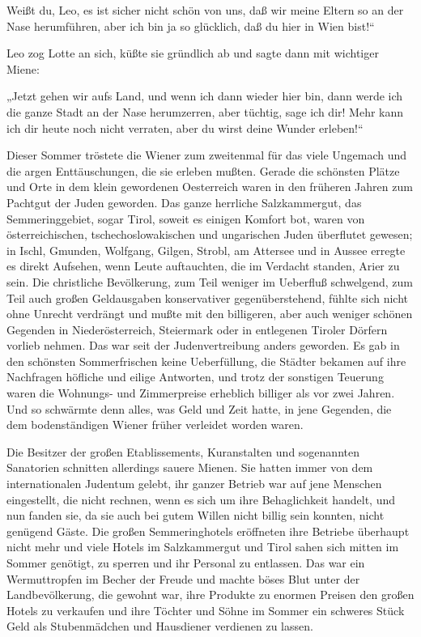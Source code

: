 Weißt du, Leo, es ist sicher nicht schön von uns, daß wir meine
Eltern so an der Nase herumführen, aber ich bin ja so glücklich,
daß du hier in Wien bist!“

Leo zog Lotte an sich, küßte sie gründlich ab und sagte dann mit
wichtiger Miene:

„Jetzt gehen wir aufs Land, und wenn ich dann wieder hier bin, dann
werde ich die ganze Stadt an der Nase herumzerren, aber tüchtig,
sage ich dir! Mehr kann  ich dir heute noch nicht
verraten, aber du wirst deine Wunder erleben!“

Dieser Sommer tröstete die Wiener zum zweitenmal für das viele
Ungemach und die argen Enttäuschungen, die sie erleben mußten.
Gerade die schönsten Plätze und Orte in dem klein gewordenen
Oesterreich waren in den früheren Jahren zum Pachtgut der Juden
geworden. Das ganze herrliche Salzkammergut, das Semmeringgebiet,
sogar Tirol, soweit es einigen Komfort bot, waren von
österreichischen, tschechoslowakischen und ungarischen Juden
überflutet gewesen; in Ischl, Gmunden, Wolfgang, Gilgen, Strobl, am
Attersee und in Aussee erregte es direkt Aufsehen, wenn Leute
auftauchten, die im Verdacht standen, Arier zu sein. Die
christliche Bevölkerung, zum Teil weniger im Ueberfluß schwelgend,
zum Teil auch großen Geldausgaben konservativer gegenüberstehend,
fühlte sich nicht ohne Unrecht verdrängt und mußte mit den
billigeren, aber auch weniger schönen Gegenden in Niederösterreich,
Steiermark oder in entlegenen Tiroler Dörfern vorlieb nehmen. Das
war seit der Judenvertreibung anders geworden. Es gab in den
schönsten Sommerfrischen keine Ueberfüllung, die Städter bekamen
auf ihre Nachfragen höfliche und eilige Antworten, und trotz der
sonstigen Teuerung waren die Wohnungs- und Zimmerpreise erheblich
billiger als vor zwei Jahren. Und so schwärmte denn alles, was Geld
und Zeit hatte, in jene Gegenden, die dem bodenständigen Wiener
früher verleidet worden waren.

Die Besitzer der großen Etablissements, Kuranstalten und
sogenannten Sanatorien schnitten allerdings sauere 
Mienen. Sie hatten immer von dem internationalen Judentum gelebt,
ihr ganzer Betrieb war auf jene Menschen eingestellt, die nicht
rechnen, wenn es sich um ihre Behaglichkeit handelt, und nun fanden
sie, da sie auch bei gutem Willen nicht billig sein konnten, nicht
genügend Gäste. Die großen Semmeringhotels eröffneten ihre Betriebe
überhaupt nicht mehr und viele Hotels im Salzkammergut und Tirol
sahen sich mitten im Sommer genötigt, zu sperren und ihr Personal
zu entlassen. Das war ein Wermuttropfen im Becher der Freude und
machte böses Blut unter der Landbevölkerung, die gewohnt war, ihre
Produkte zu enormen Preisen den großen Hotels zu verkaufen und ihre
Töchter und Söhne im Sommer ein schweres Stück Geld als
Stubenmädchen und Hausdiener verdienen zu lassen.

